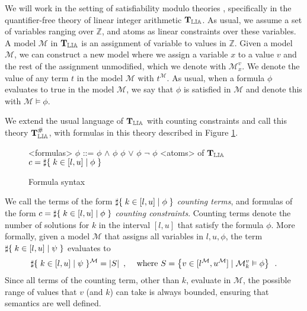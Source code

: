 
We will work in the setting of satisfiability modulo theories
\cite{barrett2009satisfiability}, specifically in the quantifier-free
theory of linear integer arithmetic $\operatorname{\mathbf{T}_{\mathbb{LIA}}}$. As usual, we assume a
set of variables ranging over $\mathbb{Z}$, and atoms as linear
constraints over these variables. A model $\mathcal{M}$ in $\operatorname{\mathbf{T}_{\mathbb{LIA}}}$ is
an assignment of variable to values in $\mathbb{Z}$. Given a model
$\mathcal{M}$, we can construct a new model where we assign a variable
$x$ to a value $v$ and the rest of the assignment unmodified, which we
denote with $\mathcal{M}^v_x$. We denote the value of any term $t$ in
the model $\mathcal{M}$ with $t^\mathcal{M}$. As usual, when a formula
$\phi$ evaluates to true in the model $\mathcal{M}$, we say that
$\phi$ is satisfied in $\mathcal{M}$ and denote this with $\mathcal{M}
\vDash \phi$.

We extend the usual language of $\operatorname{\mathbf{T}_{\mathbb{LIA}}}$ with counting constraints and
call this theory $\operatorname{\mathbf{T}^\#_{\mathbb{LIA}}}$, with formulas in this theory described in
Figure \ref{formula}.

\begin{figure}[h]
\begin{grammar}
<formulas> $\phi$ ::= $\phi$ $\land$ $\phi$
\alt $\phi$ $\lor$ $\phi$
\alt $\lnot$ $\phi$
\alt <atoms> of $\operatorname{\mathbf{T}_{\mathbb{LIA}}}$
\alt $c = \sharp\lbrace\;k \in [l, u] \;|\;\phi\;\rbrace$
\end{grammar}

\caption{Formula syntax}
\label{formula}
\end{figure}

We call the terms of the form $\sharp\lbrace\;k \in [l, u] \;|\;\phi\;\rbrace$ \emph{counting
terms}, and formulas of the form $c = \sharp\lbrace\;k \in [l, u] \;|\;\phi\;\rbrace$
\emph{counting constraints}. Counting terms denote the number of
solutions for $k$ in the interval $[l, u]$ that satisfy the formula
$\phi$. More
formally, given a model $\mathcal{M}$ that assigns all variables in
$l, u, \phi$, the term $\sharp\lbrace\;k \in [l, u] \;|\;\psi\;\rbrace$ evaluates to
\begin{align*}
  \sharp\lbrace\;k \in [l, u] \;|\;\psi\;\rbrace^\mathcal{M} = |S|\enspace, &&
  \text{ where } S = \left\lbrace v \in [l^\mathcal{M}, u^\mathcal{M}] \;|\; \mathcal{M}^v_k \vDash \phi \right\rbrace\enspace.
\end{align*}
Since all terms of the counting term, other than $k$, evaluate in
$\mathcal{M}$, the possible range of values that $v$ (and $k$) can take is
always bounded, ensuring that semantics are well defined.


